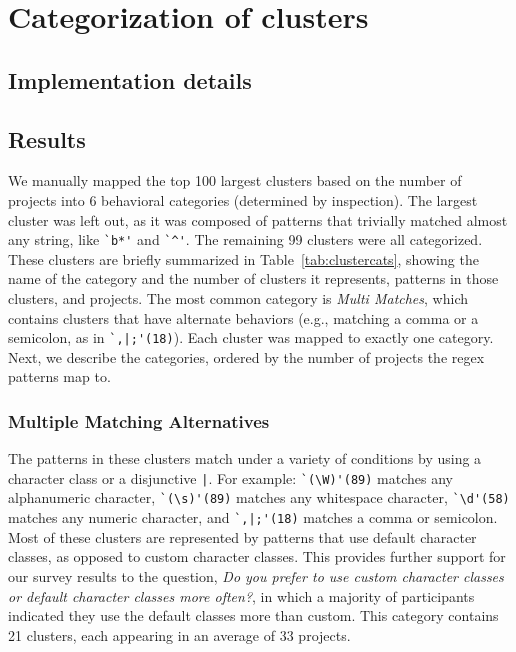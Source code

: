 \section{Categorization of clusters}
\subsection{Implementation details}
\subsection{Results}


We manually mapped the top 100 largest clusters based on the number of projects into 6 behavioral categories (determined by inspection).  The largest cluster was left out, as it was composed of patterns that trivially matched almost any string, like \verb!`b*'! and \verb!`^'!.  The remaining 99 clusters were all categorized. These clusters are briefly summarized in Table~\ref{tab:clustercats}, showing the name of the category and the number of clusters it represents, patterns in those clusters, and projects. The most common category is \emph{Multi Matches}, which contains clusters that have alternate behaviors (e.g., matching a comma or a semicolon, as in \verb!`,|;'(18)!). Each cluster was mapped to exactly one category. Next, we describe the categories, ordered by the number of projects the regex patterns map to.



\subsubsection{Multiple Matching Alternatives}
The patterns in these clusters match under a variety of conditions by using a character class or a disjunctive \verb!|!.
For example:
\verb!`(\W)'(89)! matches any alphanumeric character, \verb!`(\s)'(89)! matches any whitespace character, \verb!`\d'(58)! matches any numeric character, and \verb!`,|;'(18)! matches a comma or semicolon.  Most of these clusters are represented by patterns that use default character classes, as opposed to custom character classes.  This provides further support for our survey results to the question, \emph{Do you prefer to use custom character classes or default character classes more often?}, in which a majority of participants indicated they use the default classes more than custom.
This category contains 21 clusters, each appearing in an average of 33 projects.

